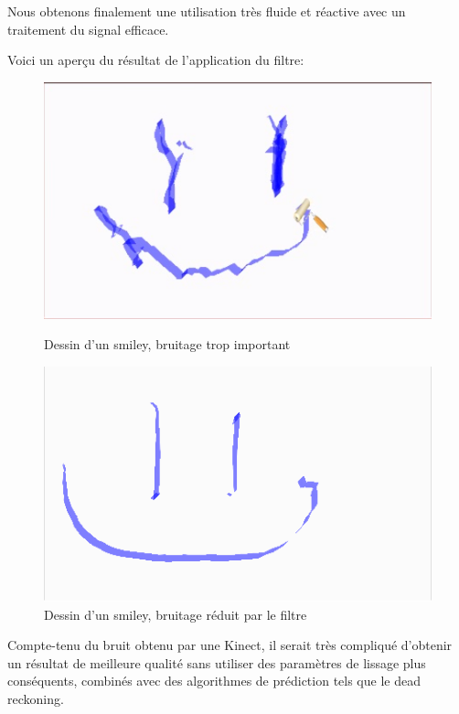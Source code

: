 Nous obtenons finalement une utilisation très fluide et réactive avec un traitement du signal efficace. 

Voici un aperçu du résultat de l'application du filtre:

\begin{figure}[!ht]
	\center
	\includegraphics[scale=0.6]{image/bruit.png}
	\caption{Dessin d'un smiley, bruitage trop important}
	\includegraphics[scale=0.6]{image/nonbruit.png}
	\caption{Dessin d'un smiley, bruitage réduit par le filtre}
\end{figure}

Compte-tenu du bruit obtenu par une Kinect, il serait très compliqué d'obtenir un résultat de meilleure qualité sans utiliser des paramètres de lissage plus conséquents, combinés avec des algorithmes de prédiction tels que le dead reckoning.